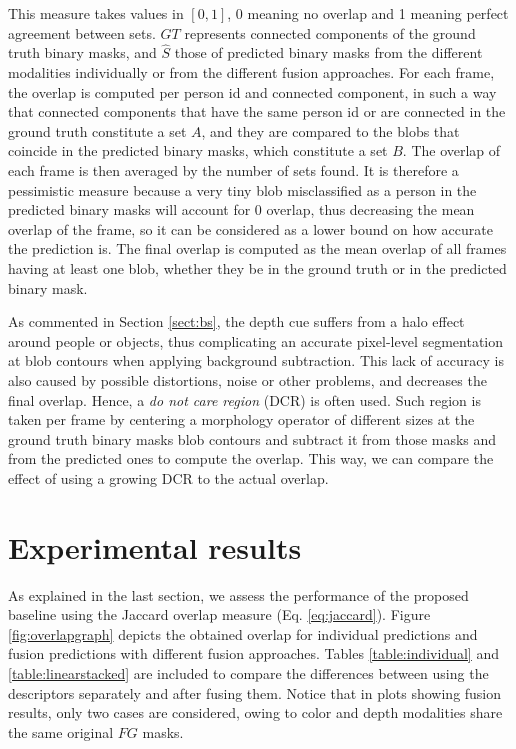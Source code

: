 \documentclass[10pt,twocolumn,letterpaper]{article}
\begin{document}
This measure takes values in $[0,1]$, 0 meaning no overlap and 1 meaning perfect agreement between sets. $GT$ represents connected components of the ground truth binary masks, and $\hat{S}$ those of predicted binary masks from the different modalities individually or from the different fusion approaches. For each frame, the overlap is computed per person id and connected component, in such a way that connected components that have the same person id  or are connected in the ground truth constitute a set $A$, and they are compared to the blobs that coincide in the predicted binary masks, which constitute a set $B$. The overlap of each frame is then averaged by the number of sets found. It is therefore a pessimistic measure because a very tiny blob misclassified as a person in the predicted binary masks will account for 0 overlap, thus decreasing the mean overlap of the frame, so it can be considered as a lower bound on how accurate the prediction is. The final overlap is computed as the mean overlap of all frames having at least one blob, whether they be in the ground truth or in the predicted binary mask.

As commented in Section \ref{sect:bs}, the depth cue suffers from a halo effect around people or objects, thus complicating an accurate pixel-level segmentation at blob contours when applying background subtraction. This lack of accuracy is also caused by possible distortions, noise or other problems, and decreases the final overlap. Hence, a \emph{do not care region} (DCR) is often used. Such region is taken per frame by centering a morphology operator of different sizes at the ground truth binary masks blob contours and subtract it from those masks and from the predicted ones to compute the overlap. This way, we can compare the effect of using a growing DCR to the actual overlap.

\section{Experimental results}
\label{ssec:experimentalresults}

As explained in the last section, we assess the performance of the proposed baseline using the Jaccard overlap measure (Eq. \ref{eq:jaccard}). Figure \ref{fig:overlapgraph} depicts the obtained overlap for individual predictions and fusion predictions with different fusion approaches. Tables \ref{table:individual} and \ref{table:linearstacked} are included to compare the differences between using the descriptors separately and after fusing them. Notice that in plots showing fusion results, only two cases are considered, owing to color and depth modalities share the same original $FG$ masks.
\end{document}
